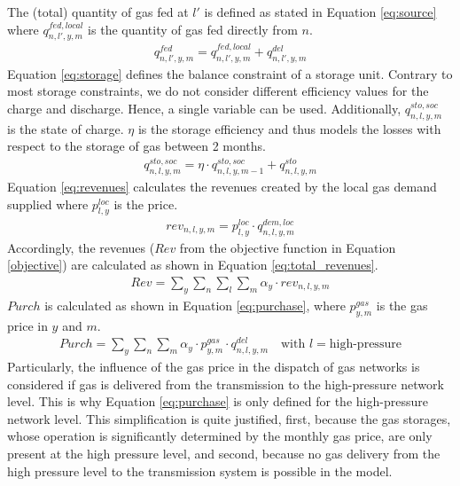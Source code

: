 The (total) quantity of gas fed at $l'$ is defined as stated in Equation \ref{eq:source} where $q^{fed,local}_{n,l',y,m}$ is the quantity of gas fed directly from $n$. 
 \begin{align}\label{eq:source}
 	q^{fed}_{n,l',y,m} = q^{fed,local}_{n,l',y,m} + q^{del}_{n,l',y,m}
 \end{align}
Equation \ref{eq:storage} defines the balance constraint of a storage unit. Contrary to most storage constraints, we do not consider different efficiency values for the charge and discharge. Hence, a single variable can be used. Additionally, $q^{sto,soc}_{n,l,y,m}$ is the state of charge. $\eta$ is the storage efficiency and thus models the losses with respect to the storage of gas between 2 months. 
\begin{align}\label{eq:storage}
		q^{sto,soc}_{n,l,y,m} = \eta \cdot q^{sto,soc}_{n,l,y,m-1} + q^{sto}_{n,l,y,m}
\end{align}
Equation \ref{eq:revenues} calculates the revenues created by the local gas demand supplied where $p^{loc}_{l,y}$ is the price. 
\begin{align}\label{eq:revenues}
	rev_{n,l,y,m} = p^{loc}_{l,y} \cdot q^{dem,loc}_{n,l,y,m}
\end{align}
Accordingly, the revenues ($Rev$ from the objective function in Equation \ref{objective}) are calculated as shown in Equation \ref{eq:total_revenues}.
\begin{align}\label{eq:total_revenues}
	Rev = \sum_{y} \sum_{n} \sum_{l} \sum_{m} \alpha_y \cdot rev_{n,l,y,m}
\end{align}
$Purch$ is calculated as shown in Equation \ref{eq:purchase}, where $p^{gas}_{y,m}$ is the gas price in $y$ and $m$. 
\begin{align}\label{eq:purchase}
	Purch = \sum_{y} \sum_{n} \sum_{m} \alpha_y \cdot p^{gas}_{y,m} \cdot q^{del}_{n,l,y,m} \quad \text{with } l=\text{high-pressure}
\end{align}
Particularly, the influence of the gas price in the dispatch of gas networks is considered if gas is delivered from the transmission to the high-pressure network level. This is why Equation \ref{eq:purchase} is only defined for the high-pressure network level. This simplification is quite justified, first, because the gas storages, whose operation is significantly determined by the monthly gas price, are only present at the high pressure level, and second, because no gas delivery from the high pressure level to the transmission system is possible in the model. 

